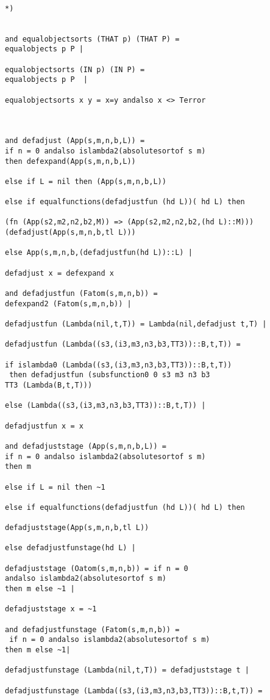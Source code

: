 \documentclass[12pt]{article}
\begin{document}
\begin{verbatim}

*)


and equalobjectsorts (THAT p) (THAT P) =
equalobjects p P |

equalobjectsorts (IN p) (IN P) =
equalobjects p P  |

equalobjectsorts x y = x=y andalso x <> Terror



and defadjust (App(s,m,n,b,L)) =
if n = 0 andalso islambda2(absolutesortof s m) 
then defexpand(App(s,m,n,b,L))

else if L = nil then (App(s,m,n,b,L))

else if equalfunctions(defadjustfun (hd L))( hd L) then 

(fn (App(s2,m2,n2,b2,M)) => (App(s2,m2,n2,b2,(hd L)::M)))
(defadjust(App(s,m,n,b,tl L)))

else App(s,m,n,b,(defadjustfun(hd L))::L) |

defadjust x = defexpand x

and defadjustfun (Fatom(s,m,n,b)) = 
defexpand2 (Fatom(s,m,n,b)) |

defadjustfun (Lambda(nil,t,T)) = Lambda(nil,defadjust t,T) |

defadjustfun (Lambda((s3,(i3,m3,n3,b3,TT3))::B,t,T)) =

if islambda0 (Lambda((s3,(i3,m3,n3,b3,TT3))::B,t,T))
 then defadjustfun (subsfunction0 0 s3 m3 n3 b3 
TT3 (Lambda(B,t,T)))

else (Lambda((s3,(i3,m3,n3,b3,TT3))::B,t,T)) |

defadjustfun x = x

and defadjuststage (App(s,m,n,b,L)) =
if n = 0 andalso islambda2(absolutesortof s m) 
then m

else if L = nil then ~1

else if equalfunctions(defadjustfun (hd L))( hd L) then 

defadjuststage(App(s,m,n,b,tl L))

else defadjustfunstage(hd L) |

defadjuststage (Oatom(s,m,n,b)) = if n = 0 
andalso islambda2(absolutesortof s m) 
then m else ~1 |

defadjuststage x = ~1

and defadjustfunstage (Fatom(s,m,n,b)) = 
 if n = 0 andalso islambda2(absolutesortof s m) 
then m else ~1|

defadjustfunstage (Lambda(nil,t,T)) = defadjuststage t |

defadjustfunstage (Lambda((s3,(i3,m3,n3,b3,TT3))::B,t,T)) =


\end{verbatim}
\end{document}
